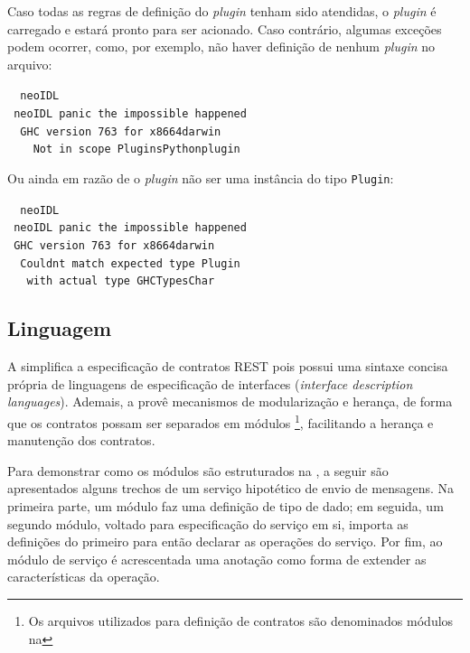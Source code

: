 Caso todas as regras de definição do \textit{plugin} tenham sido atendidas, o
\textit{plugin} é carregado e estará pronto para ser acionado. Caso contrário,
algumas exceções podem ocorrer, como, por exemplo, não haver definição de
nenhum \textit{plugin} no arquivo:

\begin{tabbing}\tt
~neoIDL\\
\tt ~neoIDL~panic~the~impossible~happened\\
\tt ~~GHC~version~763~for~x8664darwin\\
\tt ~~~~Not~in~scope~PluginsPythonplugin
\end{tabbing}

Ou ainda em razão de o \textit{plugin} não ser uma instância do tipo
\texttt{Plugin}:

\begin{tabbing}\tt
~neoIDL\\
\tt ~neoIDL~panic~the~impossible~happened\\
\tt ~GHC~version~763~for~x8664darwin\\
\tt ~~Couldnt~match~expected~type~Plugin\\
\tt ~~~with~actual~type~GHCTypesChar
\end{tabbing}



\subsection{Linguagem}
\label{linguagemNeoIDL}
\vspace{-6mm}

A \neoidl{} simplifica a especificação de contratos REST pois possui uma sintaxe
concisa própria de linguagens de especificação de interfaces (\emph{interface
description languages}). Ademais, a \neoidl{} provê mecanismos de
modularização e herança, de forma que os contratos possam ser separados em
módulos \footnote{Os arquivos utilizados para definição de contratos
são denominados módulos na \neoidl{}}, facilitando a herança e manutenção dos
contratos.

Para demonstrar como os módulos são estruturados na
\neoidl{}, a seguir são apresentados alguns trechos de um serviço hipotético
de envio de mensagens. Na primeira parte, um módulo faz uma definição de tipo
de dado; em seguida, um segundo módulo, voltado para especificação do serviço em
si, importa as definições do primeiro para então declarar as operações do
serviço. Por fim, ao módulo de serviço é acrescentada uma anotação como
forma de extender as características da operação.

